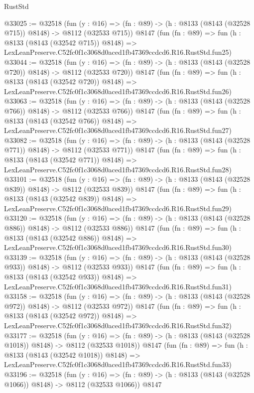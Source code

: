\begin{lexlean}{RustStd}
\begin{coremodule}
@33025 := @32518
    (fun (y : @16) => (fn : @89) -> (h : @8133 (@8143 (@32528 @715)) @8148) -> @8112 (@32533 @715))
    @8147
    (fun (fn : @89) =>
    fun (h : @8133 (@8143 (@32542 @715)) @8148) =>
    LexLeanPreserve.C52fc0f1c3068d0aced1fb47369ccdcd6.R16.RustStd.fun25)
@33044 := @32518
    (fun (y : @16) => (fn : @89) -> (h : @8133 (@8143 (@32528 @720)) @8148) -> @8112 (@32533 @720))
    @8147
    (fun (fn : @89) =>
    fun (h : @8133 (@8143 (@32542 @720)) @8148) =>
    LexLeanPreserve.C52fc0f1c3068d0aced1fb47369ccdcd6.R16.RustStd.fun26)
@33063 := @32518
    (fun (y : @16) => (fn : @89) -> (h : @8133 (@8143 (@32528 @766)) @8148) -> @8112 (@32533 @766))
    @8147
    (fun (fn : @89) =>
    fun (h : @8133 (@8143 (@32542 @766)) @8148) =>
    LexLeanPreserve.C52fc0f1c3068d0aced1fb47369ccdcd6.R16.RustStd.fun27)
@33082 := @32518
    (fun (y : @16) => (fn : @89) -> (h : @8133 (@8143 (@32528 @771)) @8148) -> @8112 (@32533 @771))
    @8147
    (fun (fn : @89) =>
    fun (h : @8133 (@8143 (@32542 @771)) @8148) =>
    LexLeanPreserve.C52fc0f1c3068d0aced1fb47369ccdcd6.R16.RustStd.fun28)
@33101 := @32518
    (fun (y : @16) => (fn : @89) -> (h : @8133 (@8143 (@32528 @839)) @8148) -> @8112 (@32533 @839))
    @8147
    (fun (fn : @89) =>
    fun (h : @8133 (@8143 (@32542 @839)) @8148) =>
    LexLeanPreserve.C52fc0f1c3068d0aced1fb47369ccdcd6.R16.RustStd.fun29)
@33120 := @32518
    (fun (y : @16) => (fn : @89) -> (h : @8133 (@8143 (@32528 @886)) @8148) -> @8112 (@32533 @886))
    @8147
    (fun (fn : @89) =>
    fun (h : @8133 (@8143 (@32542 @886)) @8148) =>
    LexLeanPreserve.C52fc0f1c3068d0aced1fb47369ccdcd6.R16.RustStd.fun30)
@33139 := @32518
    (fun (y : @16) => (fn : @89) -> (h : @8133 (@8143 (@32528 @933)) @8148) -> @8112 (@32533 @933))
    @8147
    (fun (fn : @89) =>
    fun (h : @8133 (@8143 (@32542 @933)) @8148) =>
    LexLeanPreserve.C52fc0f1c3068d0aced1fb47369ccdcd6.R16.RustStd.fun31)
@33158 := @32518
    (fun (y : @16) => (fn : @89) -> (h : @8133 (@8143 (@32528 @972)) @8148) -> @8112 (@32533 @972))
    @8147
    (fun (fn : @89) =>
    fun (h : @8133 (@8143 (@32542 @972)) @8148) =>
    LexLeanPreserve.C52fc0f1c3068d0aced1fb47369ccdcd6.R16.RustStd.fun32)
@33177 := @32518
    (fun (y : @16) =>
    (fn : @89) -> (h : @8133 (@8143 (@32528 @1018)) @8148) -> @8112 (@32533 @1018))
    @8147
    (fun (fn : @89) =>
    fun (h : @8133 (@8143 (@32542 @1018)) @8148) =>
    LexLeanPreserve.C52fc0f1c3068d0aced1fb47369ccdcd6.R16.RustStd.fun33)
@33196 := @32518
    (fun (y : @16) =>
    (fn : @89) -> (h : @8133 (@8143 (@32528 @1066)) @8148) -> @8112 (@32533 @1066))
    @8147

\end{coremodule}
\end{lexlean}
